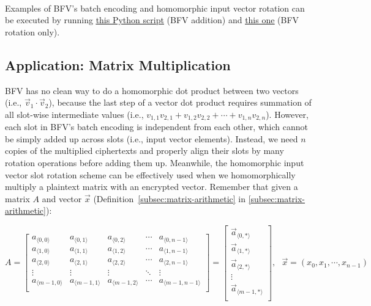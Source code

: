 $ $




 Examples of BFV's batch encoding and homomorphic input vector rotation can be executed by running \href{https://github.com/fhetextbook/fhe-textbook/blob/main/source%20code/bfv.py}{\underline{this Python script}} (BFV addition) and \href{https://github.com/fhetextbook/fhetextbook.github.io/blob/main/source%20code/bfv_rotation_only.py}{\underline{this one}} (BFV rotation only). 



\subsection{Application: Matrix Multiplication}
\label{subsec:bfv-matrix-multiplication}

BFV has no clean way to do a homomorphic dot product between two vectors (i.e., $\vec{v}_1 \cdot \vec{v}_2$), because the last step of a vector dot product requires summation of all slot-wise intermediate values (i.e., $v_{1,1}v_{2,1} + v_{1,2}v_{2,2} + \cdots + v_{1,n}v_{2,n}$). However, each slot in BFV's batch encoding is independent from each other, which cannot be simply added up across slots (i.e., input vector elements). Instead, we need $n$ copies of the multiplied ciphertexts and properly align their slots by many rotation operations before adding them up. Meanwhile, the homomorphic input vector slot rotation scheme can be effectively used when we homomorphically multiply a plaintext matrix with an encrypted vector. Remember that given a matrix $A$ and vector $\vec{x}$ (Definition~\ref*{subsec:matrix-arithmetic} in \autoref{subsec:matrix-arithmetic}):

$A = \begin{bmatrix}
 a_{\langle 0, 0\rangle} & a_{\langle 0, 1\rangle} & a_{\langle 0, 2\rangle} & \cdots & a_{\langle 0, n-1\rangle}\\
 a_{\langle 1, 0\rangle} & a_{\langle 1, 1\rangle} & a_{\langle 1, 2\rangle} & \cdots & a_{\langle 1, n-1\rangle} \\
 a_{\langle 2, 0\rangle} & a_{\langle 2, 1\rangle} & a_{\langle 2, 2\rangle} & \cdots & a_{\langle 2, n-1\rangle} \\
\vdots & \vdots & \vdots & \ddots & \vdots \\
 a_{\langle m-1, 0\rangle} & a_{\langle m-1, 1\rangle} & a_{\langle m-1, 2\rangle} & \cdots & a_{\langle m-1, n-1\rangle} \\
\end{bmatrix} = \begin{bmatrix} 
\vec{a}_{\langle 0, * \rangle} \\ 
\vec{a}_{\langle 1, * \rangle} \\ 
\vec{a}_{\langle 2, * \rangle} \\ 
\vdots\\
\vec{a}_{\langle m-1, * \rangle} \\ 
\end{bmatrix}, \text{ } \vec{x} = (x_0, x_1, \cdots, x_{n-1})$

